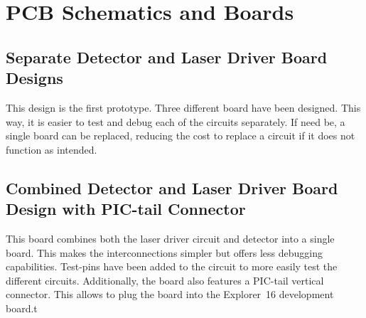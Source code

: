 \documentclass[\home/main.tex]{subfiles}
\begin{document}
\chapter{PCB Schematics and Boards}\label{PCB}

\section{Separate Detector and Laser Driver Board Designs}

  This design is the first prototype. Three different board have been designed. This way, it is easier to test and debug each of the circuits separately. If need be, a single board can be replaced, reducing the cost to replace a circuit if it does not function as intended.


\section{Combined Detector and Laser Driver Board Design with PIC-tail Connector}

  This board combines both the laser driver circuit and detector into a single board. This makes the interconnections simpler but offers less debugging capabilities. Test-pins have been added to the circuit to more easily test the different circuits. Additionally, the board also features a PIC-tail vertical connector. This allows to plug the board into the Explorer~16 development board.t
\end{document}
